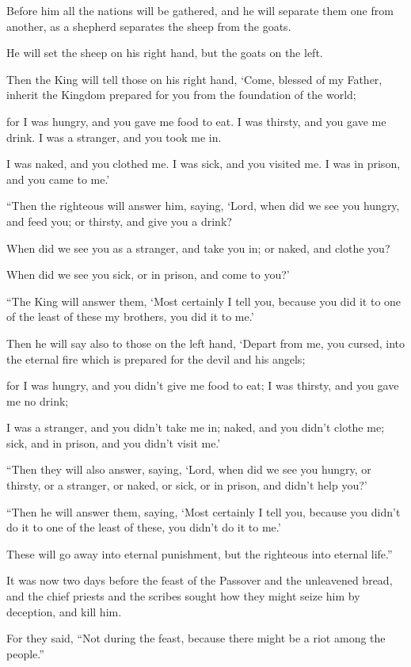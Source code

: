 Before him all the nations will be gathered, and he will separate them one from another, as a shepherd separates the sheep from the goats.

He will set the sheep on his right hand, but the goats on the left.

Then the King will tell those on his right hand, ‘Come, blessed of my Father, inherit the Kingdom prepared for you from the foundation of the world;

for I was hungry, and you gave me food to eat. I was thirsty, and you gave me drink. I was a stranger, and you took me in.

I was naked, and you clothed me. I was sick, and you visited me. I was in prison, and you came to me.’

“Then the righteous will answer him, saying, ‘Lord, when did we see you hungry, and feed you; or thirsty, and give you a drink?

When did we see you as a stranger, and take you in; or naked, and clothe you?

When did we see you sick, or in prison, and come to you?’

“The King will answer them, ‘Most certainly I tell you, because you did it to one of the least of these my brothers,  you did it to me.’

Then he will say also to those on the left hand, ‘Depart from me, you cursed, into the eternal fire which is prepared for the devil and his angels;

for I was hungry, and you didn’t give me food to eat; I was thirsty, and you gave me no drink;

I was a stranger, and you didn’t take me in; naked, and you didn’t clothe me; sick, and in prison, and you didn’t visit me.’

“Then they will also answer, saying, ‘Lord, when did we see you hungry, or thirsty, or a stranger, or naked, or sick, or in prison, and didn’t help you?’

“Then he will answer them, saying, ‘Most certainly I tell you, because you didn’t do it to one of the least of these, you didn’t do it to me.’

These will go away into eternal punishment, but the righteous into eternal life.”

It was now two days before the feast of the Passover and the unleavened bread, and the chief priests and the scribes sought how they might seize him by deception, and kill him.

For they said, “Not during the feast, because there might be a riot among the people.”


